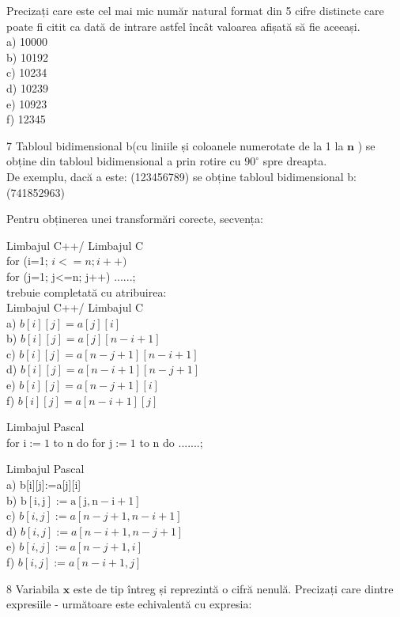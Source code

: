 \documentclass[10pt]{article}
\begin{document}
Precizați care este cel mai mic număr natural format din 5 cifre distincte care poate fi citit ca dată de intrare astfel încât valoarea afișată să fie aceeași.\\
a) 10000\\
b) 10192\\
c) 10234\\
d) 10239\\
e) 10923\\
f) 12345

7 Tabloul bidimensional b(cu liniile și coloanele numerotate de la 1 la $\mathbf{n}$ ) se obține din tabloul bidimensional a prin rotire cu $90^{\circ}$ spre dreapta.\\
De exemplu, dacă a este: (123456789) se obține tabloul bidimensional b:\\
(741852963)

Pentru obținerea unei transformări corecte, secvența:

Limbajul C++/ Limbajul C\\
for (i=1; $i<=n ; i++)$\\
for (j=1; j<=n; j++) ......;\\
trebuie completată cu atribuirea:\\
Limbajul C++/ Limbajul C\\
a) $b[i][j]=a[j][i]$\\
b) $b[i][j]=a[j][n-i+1]$\\
c) $b[i][j]=a[n-j+1][n-i+1]$\\
d) $b[i][j]=a[n-i+1][n-j+1]$\\
e) $b[i][j]=a[n-j+1][i]$\\
f) $b[i][j]=a[n-i+1][j]$

Limbajul Pascal\\
for $\mathrm{i}:=1$ to n do for $\mathrm{j}:=1$ to n do .......;

Limbajul Pascal\\[0pt]
a) b[i][j]:=a[j][i]\\
b) $\mathrm{b}[\mathrm{i}, \mathrm{j}]:=\mathrm{a}[\mathrm{j}, \mathrm{n}-\mathrm{i}+1]$\\
c) $b[i, j]:=a[n-j+1, n-i+1]$\\
d) $b[i, j]:=a[n-i+1, n-j+1]$\\
e) $b[i, j]:=a[n-j+1, i]$\\
f) $b[i, j]:=a[n-i+1, j]$

8 Variabila $\mathbf{x}$ este de tip întreg și reprezintă o cifră nenulă. Precizați care dintre expresiile - următoare este echivalentă cu expresia:
\end{document}
